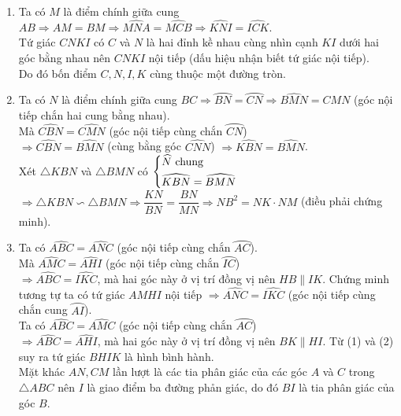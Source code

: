 \begin{bt}
{\begin{center}
\begin{tikzpicture}[scale=.8]
			\end{tikzpicture}
		\end{center}
		\begin{enumerate}
			\item Ta có $M$ là điểm chính giữa cung $AB \Rightarrow AM=BM \Rightarrow \widehat{MNA}=\widehat{MCB} \Rightarrow \widehat{KNI}=\widehat{ICK}$. \\
			Tứ giác $CNKI$ có $C$ và $N$ là hai đỉnh kề nhau cùng nhìn cạnh $KI$ dưới hai góc bằng nhau nên $CNKI$ nội tiếp (dấu hiệu nhận biết tứ giác nội tiếp).\\
			Do đó bốn điểm $C,N,I,K$ cùng thuộc một đường tròn.
			\item Ta có $N$ là điểm chính giữa cung $BC \Rightarrow \wideparen{BN}=\wideparen{CN} \Rightarrow  \widehat{BMN}=\widehat{CMN}$ (góc nội tiếp chắn hai cung bằng nhau).\\
			Mà $\widehat{CBN}=\widehat{CMN}$ (góc nội tiếp cùng chắn $\wideparen{CN}$)\\
			$\Rightarrow \widehat{CBN}=\widehat{BMN}$ (cùng bằng góc $\widehat{CNN}$) $\Rightarrow \widehat{KBN}=\widehat{BMN}$.\\
			Xét $\triangle KBN$ và $\triangle BMN$ có
			$\heva{& \widehat{N} \ \text{chung}\\& \widehat{KBN}=\widehat{BMN}}$\\
			$\Rightarrow  \triangle KBN \backsim \triangle BMN  \Rightarrow \dfrac{KN}{BN}=\dfrac{BN}{MN} \Rightarrow NB^2=NK \cdot NM$ (điều phải chứng minh).
			\item Ta có $\widehat{ABC}=\widehat{ANC}$ (góc nội tiếp cùng chắn $\wideparen{AC}$).\\			
			Mà $\widehat{AMC}=\widehat{AHI}$ (góc nội tiếp cùng chắn $\wideparen{IC}$)\\
			$\Rightarrow \widehat{ABC}=\widehat{IKC}$, mà hai góc này ở vị trí đồng vị nên $HB \parallel IK $. 
			Chứng minh tương tự ta có tứ giác $AMHI$ nội tiếp $ \Rightarrow \widehat{ANC}=\widehat{IKC}$ (góc nội tiếp cùng chắn cung $\wideparen{AI}$).\\
			Ta có  $  \widehat{ABC}=\widehat{AMC}$ (góc nội tiếp cùng chắn $\wideparen{AC}$)\\
			$ \Rightarrow \widehat{ABC}=\widehat{AHI}$, mà hai góc này ở vị trí đồng vị nên $BK \parallel HI$. 	
			Từ (1) và (2) suy ra tứ giác $BHIK$ là hình bình hành.\\
			Mặt khác $AN, CM$ lần lượt là các tia phân giác của các góc $A$ và $C$ trong $\triangle ABC$ nên $I$ là giao điểm ba đường phån giác, do đó $BI$ là tia phân giác của góc $B$.\\

\end{enumerate}}
\end{bt}
